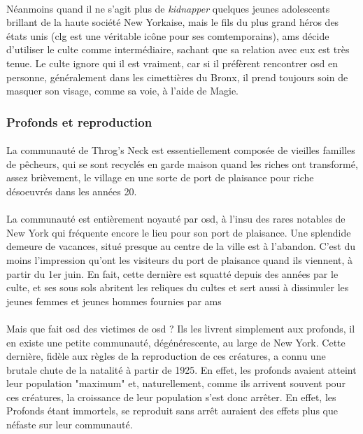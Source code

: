 \paragraph{} Néanmoins quand il ne s'agit plus de \emph{kidnapper} quelques jeunes adolescents brillant 
de la haute société New Yorkaise, mais le fils du plus grand héros des états unis (\gls{clg} est une véritable 
icône pour ses comtemporains), \gls{ams} décide d'utiliser le culte comme intermédiaire, sachant que sa 
relation avec eux est très tenue. Le culte ignore qui il est vraiment, car si il préfèrent rencontrer \gls{osd}
en personne, généralement dans les cimettières du Bronx, il prend toujours soin de masquer son visage, comme
sa voie, à l'aide de Magie.

\subsubsection{Profonds et reproduction}

\paragraph{} La communauté de Throg's Neck est essentiellement composée de vieilles familles de pêcheurs, 
qui se sont recyclés en garde maison quand les riches ont transformé, assez brièvement, le village en une
sorte de port de plaisance pour riche désoeuvrés dans les années 20.

\paragraph{} La communauté est entièrement noyauté par \gls{osd}, à l'insu des rares notables de New York qui
fréquente encore le lieu pour son port de plaisance. Une splendide demeure de vacances, situé presque au centre
de la ville est à l'abandon. C'est du moins l'impression qu'ont les visiteurs du port de plaisance quand ils
viennent, à partir du 1er juin. En fait, cette dernière est squatté depuis des années par le culte, et ses 
sous sols abritent les reliques du cultes et sert aussi à dissimuler les jeunes femmes et jeunes hommes 
fournies par \gls{ams}

\paragraph{} Mais que fait \gls{osd} des victimes de \gls{osd} ? Ils les livrent simplement aux profonds, il en 
existe une petite communauté, dégénérescente, au large de New York. Cette dernière, fidèle aux règles de la
reproduction de ces créatures, a connu une brutale chute de la natalité à partir de 1925. En effet, les 
profonds avaient atteint leur population "maximum" et, naturellement, comme ils arrivent souvent pour ces 
créatures, la croissance de leur population s'est donc arrêter. En effet, les Profonds étant immortels, se reproduit
sans arrêt auraient des effets plus que néfaste sur leur communauté.

